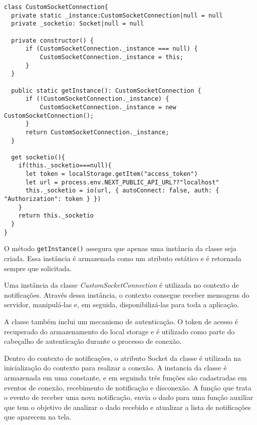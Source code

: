 \begin{verbatim}
class CustomSocketConnection{
  private static _instance:CustomSocketConnection|null = null
  private _socketio: Socket|null = null

  private constructor() {
      if (CustomSocketConnection._instance === null) {
          CustomSocketConnection._instance = this;
      }
  }

  public static getInstance(): CustomSocketConnection {
      if (!CustomSocketConnection._instance) {
          CustomSocketConnection._instance = new CustomSocketConnection();
      }
      return CustomSocketConnection._instance;
  }

  get socketio(){
    if(this._socketio===null){
      let token = localStorage.getItem("access_token")
      let url = process.env.NEXT_PUBLIC_API_URL??"localhost"
      this._socketio = io(url, { autoConnect: false, auth: { "Authorization": token } })
    }
    return this._socketio
  }
}
\end{verbatim}

O método \texttt{getInstance()} assegura que apenas uma instância da classe seja criada. Essa instância é armazenada como um atributo estático e é retornada sempre que solicitada. 

Uma instância da classe \textit{CustomSocketConnection} é utilizada no contexto de notificações. Através dessa instância, o contexto consegue receber mensagens do servidor, manipulá-las e, em seguida, disponibilizá-las para toda a aplicação. 

A classe também inclui um mecanismo de autenticação. O token de acesso é recuperado do armazenamento do local storage \cite{mdnLocalStorage} e é utilizado como parte do cabeçalho de autenticação durante o processo de conexão.

Dentro do contexto de notificações, o atributo Socket da classe é utilizada na inicialização do contexto para realizar a conexão. A instancia da classe é armazenada em uma constante, e em seguinda três funções são cadastradas em eventos de conexão, recebimento de notificação e disconexão. A função que trata o evento de receber uma nova notificação, envia o dado para uma função auxiliar que tem  o objetivo de analizar o dado recebido e atualizar a lista de notificações que aparecem na tela.

